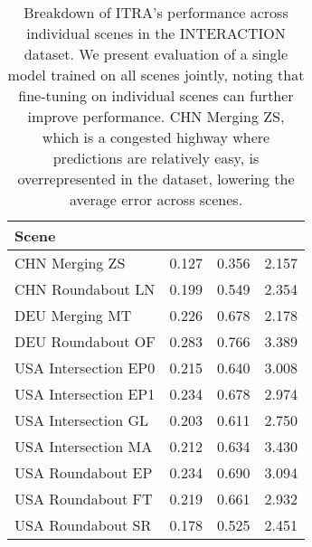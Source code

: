 \documentclass[letterpaper, 10 pt, conference]{ieeeconf}
\begin{document}
\begin{table}[]
\centering
\caption{Breakdown of ITRA's performance across individual scenes in the INTERACTION dataset. We present evaluation of a single model trained on all scenes jointly, noting that fine-tuning on individual scenes can further improve performance. CHN Merging ZS, which is a congested highway where predictions are relatively easy, is overrepresented in the dataset, lowering the average error across scenes.}
\label{tab:individual-scenes}
\begin{tabular}{l|ccc}
\toprule
Scene &  &  & \\
\midrule
CHN Merging ZS & 0.127 & 0.356 & 2.157 \\
CHN Roundabout LN & 0.199 & 0.549 & 2.354 \\
DEU Merging MT & 0.226 & 0.678 & 2.178 \\
DEU Roundabout OF & 0.283 & 0.766 & 3.389 \\
USA Intersection EP0 & 0.215 & 0.640 & 3.008 \\
USA Intersection EP1 & 0.234 & 0.678 & 2.974 \\
USA Intersection GL & 0.203 & 0.611 & 2.750 \\
USA Intersection MA & 0.212 & 0.634 & 3.430 \\
USA Roundabout EP & 0.234 & 0.690 & 3.094 \\
USA Roundabout FT & 0.219 & 0.661 & 2.932 \\
USA Roundabout SR & 0.178 & 0.525 & 2.451 \\
\bottomrule
\end{tabular}
\end{table}
\end{document}
